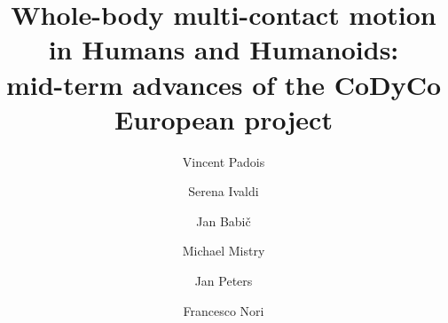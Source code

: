 \documentclass[final,5p,twocolumn]{elsarticle}
\begin{document}
\begin{frontmatter}



\title{Whole-body multi-contact motion in Humans and Humanoids:\\mid-term advances of the CoDyCo European project}


\author{Vincent Padois}
\address{Sorbonne Universit\'{e}s, UPMC Univ Paris 06, UMR 7222, Institut des Syst\`{e}mes Intelligents et de Robotique, Paris, France.\\CNRS, UMR 7222, Institut des Syst\`{e}mes Intelligents et de Robotique, Paris, France. Email: vincent.padois@upmc.fr}

\author{Serena Ivaldi}
\address{Inria, Villers-l\`{e}s-Nancy, France.\\
CNRS  \& Universit\'e de Lorraine, UMR 7503, Loria, Vandoeuvre-l\`{e}s-Nancy, France. Email: serena.ivaldi@inria.fr}

\author{Jan Babi\v{c}}
\address{Jo\v{z}ef Stefan Institute, Ljubljana, Slovenia. Email: jan.babic@ijs.si}

\author{Michael Mistry }
\address{University of Birmingham, Birmingham, United Kingdom. Email: m.n.mistry@bham.ac.uk}

\author{Jan Peters}
\address{Max Planck Institute for Intelligent Systems and TU Darmstadt, Darmstadt, Germany. Email: mail@jan-peters.net}

\author{Francesco Nori}
\address{Robotics, Brain and Cognitive Science Department, Istituto Italiano di Tecnologia, Genova, Italy. Email: francesco.nori@iit.it}



\end{frontmatter}
\end{document}

